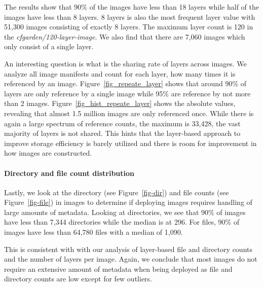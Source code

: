 The results show that 90\% of the images have less than 18 layers while
half of the images have less than 8 layers. 8 layers is also the most
frequent layer value with 51,300 images consisting of exactly 8 layers.
The maximum layer count is 120 in the \textit{cfgarden/120-layer-image}.
We also find that there are 7,060 images which only consist of a single layer.




An interesting question is what is the sharing rate of layers across images.
We analyze all image manifests and count for each layer, how many times it
is referenced by an image. Figure~\ref{fig_repeate_layer} shows that around 90\%
of layers are only reference by a single image while 95\% are reference by not
more than 2 images.
%
Figure~\ref{fig_hist_repeate_layer} shows the absolute values, revealing that
almost 1.5 million images are only referenced once. While there is again a large
spectrum of reference counts, the maximum is 33,428, the vast majority of layers
is not shared. This hints that the layer-based approach to improve storage
efficiency is barely utilized and there is room for improvement in how images
are constructed.




\paragraph{Directory and file count distribution}



Lastly, we look at the directory (see Figure~\ref{fig-dir}) and file counts
(see Figure~\ref{fig-file}) in images to determine if deploying
images requires handling of large amounts of metadata. Looking at directories,
we see that 90\% of images have less than 7,344 directories while the median
is at 296. For files, 90\% of images have less than 64,780 files with a median
of 1,090.

This is consistent with with our analysis of layer-based file and directory counts
and the number of layers per image. Again, we conclude that most images
do not require an extensive amount of metadata when being deployed as file and
directory counts are low except for few outliers.


